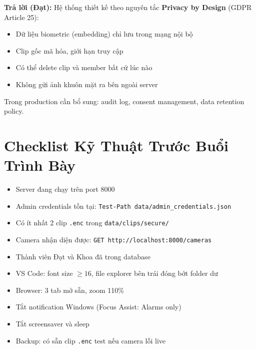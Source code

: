 \documentclass[12pt, a4paper]{article}
\begin{document}
\begin{tcolorbox}[colback=gray!5, colframe=MidnightBlue, title=\textbf{Q6: GDPR / Luật bảo vệ dữ liệu?},
  breakable]
\textbf{Trả lời (Đạt):}
Hệ thống thiết kế theo nguyên tắc \textbf{Privacy by Design} (GDPR Article 25):
\begin{itemize}
  \item Dữ liệu biometric (embedding) chỉ lưu trong mạng nội bộ
  \item Clip gốc mã hóa, giới hạn truy cập
  \item Có thể delete clip và member bất cứ lúc nào
  \item Không gửi ảnh khuôn mặt ra bên ngoài server
\end{itemize}
Trong production cần bổ sung: audit log, consent management, data retention policy.
\end{tcolorbox}

\section{Checklist Kỹ Thuật Trước Buổi Trình Bày}

\begin{tcolorbox}[colback=OliveGreen!5, colframe=OliveGreen, title=\textbf{Checklist 30 phút trước}]
\begin{itemize}
  \item[$\square$] Server đang chạy trên port 8000
  \item[$\square$] Admin credentials tồn tại: \texttt{Test-Path data/admin\_credentials.json}
  \item[$\square$] Có ít nhất 2 clip \texttt{.enc} trong \texttt{data/clips/secure/}
  \item[$\square$] Camera nhận diện được: \texttt{GET http://localhost:8000/cameras}
  \item[$\square$] Thành viên Đạt và Khoa đã trong database
  \item[$\square$] VS Code: font size $\geq 16$, file explorer bên trái đóng bớt folder dư
  \item[$\square$] Browser: 3 tab mở sẵn, zoom 110\%
  \item[$\square$] Tắt notification Windows (Focus Assist: Alarms only)
  \item[$\square$] Tắt screensaver và sleep
  \item[$\square$] Backup: có sẵn clip \texttt{.enc} test nếu camera lỗi live
\end{itemize}
\end{tcolorbox}
\end{document}
